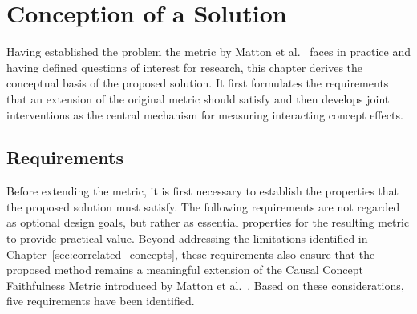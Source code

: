 \chapter{Conception of a Solution}
\label{sec:conception}
Having established the problem the metric by Matton et al.~\cite{mattonWalkTalkMeasuring2024} faces in practice and having defined questions of interest for research, this chapter derives the conceptual basis of the proposed solution. It first formulates the requirements that an extension of the original metric should satisfy and then develops joint interventions as the central mechanism for measuring interacting concept effects.

\section{Requirements}
\label{sec:requirements}
Before extending the metric, it is first necessary to establish the properties that the proposed solution must satisfy. The following requirements are not regarded as optional design goals, but rather as essential properties for the resulting metric to provide practical value. Beyond addressing the limitations identified in Chapter~\ref{sec:correlated_concepts}, these requirements also ensure that the proposed method remains a meaningful extension of the Causal Concept Faithfulness Metric introduced by Matton et al.~\cite{mattonWalkTalkMeasuring2024}. Based on these considerations, five requirements have been identified.

